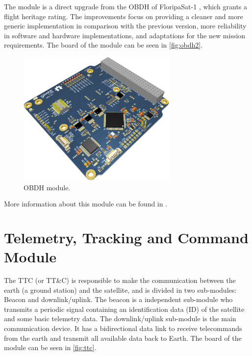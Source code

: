 The module is a direct upgrade from the OBDH of FloripaSat-1 \cite{floripasat}, which grants a flight heritage rating. The improvements focus on providing a cleaner and more generic implementation in comparison with the previous version, more reliability in software and hardware implementations, and adaptations for the new mission requirements. The board of the module can be seen in \autoref{fig:obdh2}.

\begin{figure}[!ht]
    \begin{center}
        \includegraphics[width=0.7\textwidth]{figures/obdh2-pcb-3d}
        \caption{OBDH module.}
        \label{fig:obdh2}
    \end{center}
\end{figure}

More information about this module can be found in \cite{obdh2}.

\section{Telemetry, Tracking and Command Module}

The TTC (or TT\&C) is responsible to make the communication between the earth (a ground station) and the satellite, and is divided in two sub-modules: Beacon and downlink/uplink. The beacon is a independent sub-module who transmits a periodic signal containing an identification data (ID) of the satellite and some basic telemetry data. The downlink/uplink sub-module is the main communication device. It has a bidirectional data link to receive telecommands from the earth and transmit all available data back to Earth. The board of the module can be seen in \autoref{fig:ttc}.

